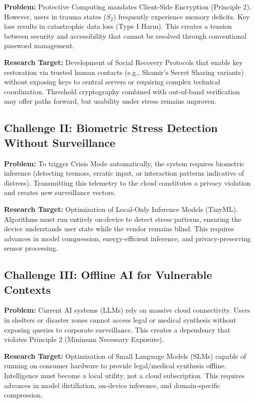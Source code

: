 \documentclass[acmsmall,review]{acmart}
\begin{document}
\textbf{Problem:} Protective Computing mandates Client-Side Encryption (Principle 2). However, users in trauma states ($S_2$) frequently experience memory deficits. Key loss results in catastrophic data loss (Type I Harm). This creates a tension between security and accessibility that cannot be resolved through conventional password management.

\textbf{Research Target:} Development of Social Recovery Protocols that enable key restoration via trusted human contacts (e.g., Shamir's Secret Sharing variants) without exposing keys to central servers or requiring complex technical coordination. Threshold cryptography combined with out-of-band verification may offer paths forward, but usability under stress remains unproven.

\subsection{Challenge II: Biometric Stress Detection Without Surveillance}

\textbf{Problem:} To trigger Crisis Mode automatically, the system requires biometric inference (detecting tremors, erratic input, or interaction patterns indicative of distress). Transmitting this telemetry to the cloud constitutes a privacy violation and creates new surveillance vectors.

\textbf{Research Target:} Optimization of Local-Only Inference Models (TinyML). Algorithms must run entirely on-device to detect stress patterns, ensuring the device understands user state while the vendor remains blind. This requires advances in model compression, energy-efficient inference, and privacy-preserving sensor processing.

\subsection{Challenge III: Offline AI for Vulnerable Contexts}

\textbf{Problem:} Current AI systems (LLMs) rely on massive cloud connectivity. Users in shelters or disaster zones cannot access legal or medical synthesis without exposing queries to corporate surveillance. This creates a dependency that violates Principle 2 (Minimum Necessary Exposure).

\textbf{Research Target:} Optimization of Small Language Models (SLMs) capable of running on consumer hardware to provide legal/medical synthesis offline. Intelligence must become a local utility, not a cloud subscription. This requires advances in model distillation, on-device inference, and domain-specific compression.
\end{document}
